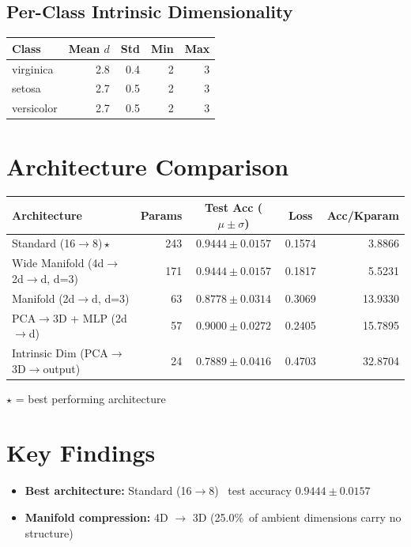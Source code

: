 \documentclass[11pt,letterpaper]{article}
\begin{document}
\subsection{Per-Class Intrinsic Dimensionality}

\begin{tabular}{@{}lrrrr@{}}
\toprule
Class & Mean $d$ & Std & Min & Max \\
\midrule
  virginica & 2.8 & 0.4 & 2 & 3 \\
  setosa & 2.7 & 0.5 & 2 & 3 \\
  versicolor & 2.7 & 0.5 & 2 & 3 \\
\bottomrule
\end{tabular}

\section{Architecture Comparison}

{\small
\begin{tabular}{@{}p{7cm}rccr@{}}
\toprule
\textbf{Architecture} & \textbf{Params} & \textbf{Test Acc ($\mu \pm \sigma$)} & \textbf{Loss} & \textbf{Acc/Kparam} \\
\midrule
  {\color{wincolor}Standard (16$\rightarrow$8)\,$\star$} & 243 & $0.9444 \pm 0.0157$ & 0.1574 & 3.8866 \\
  {Wide Manifold (4d$\rightarrow$2d$\rightarrow$d, d=3)} & 171 & $0.9444 \pm 0.0157$ & 0.1817 & 5.5231 \\
  {Manifold (2d$\rightarrow$d, d=3)} & 63 & $0.8778 \pm 0.0314$ & 0.3069 & 13.9330 \\
  {PCA$\rightarrow$3D + MLP (2d$\rightarrow$d)} & 57 & $0.9000 \pm 0.0272$ & 0.2405 & 15.7895 \\
  {Intrinsic Dim (PCA$\rightarrow$3D$\rightarrow$output)} & 24 & $0.7889 \pm 0.0416$ & 0.4703 & 32.8704 \\
\bottomrule
\end{tabular}
}

\smallskip
{\small $\star$ = best performing architecture}

\section{Key Findings}

\begin{itemize}[leftmargin=*,itemsep=3pt]
  \item \textbf{Best architecture:} Standard (16$\rightarrow$8) \textemdash\ test accuracy $0.9444 \pm 0.0157$
  \item \textbf{Manifold compression:} 4D $\rightarrow$ 3D (25.0\%\ of ambient dimensions carry no structure)
\end{itemize}
\end{document}
